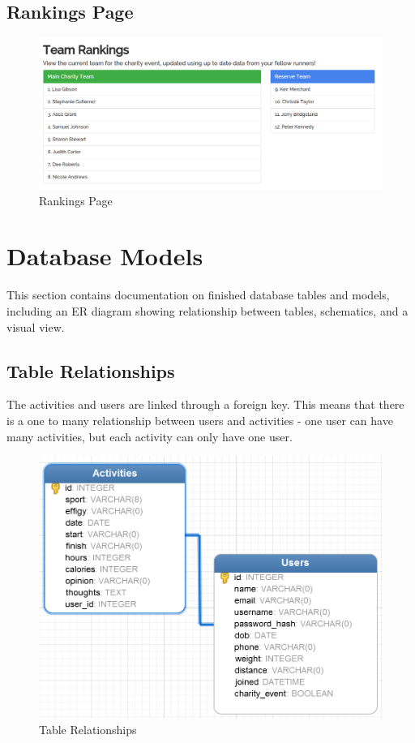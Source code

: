 \documentclass{article}[12pt,a4paper]
\begin{document}
\clearpage

\subsection{Rankings Page}

\begin{figure}[h!]
  \includegraphics[scale=0.35]{final_ui/rankings}
  \caption{Rankings Page}
\end{figure}

\section{Database Models}
This section contains documentation on finished database tables and models, including an ER diagram showing relationship between tables, schematics, and a visual view.

\subsection{Table Relationships}
The activities and users are linked through a foreign key. This means that there is a one to many relationship between users and activities - one user can have many activities, but each activity can only have one user.

\begin{figure}[h!]
  \includegraphics[scale=0.5]{images/database/er_diagram}
  \caption{Table Relationships}
\end{figure}
\end{document}

